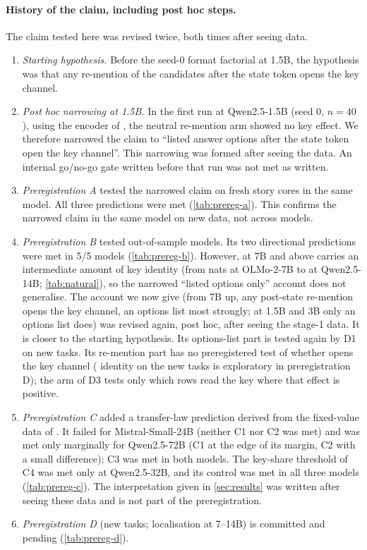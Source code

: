 \paragraph{History of the claim, including post hoc steps.} The claim tested here was revised twice, both times after seeing data.
\begin{enumerate}\setlength\itemsep{1pt}
  \item \emph{Starting hypothesis.} Before the seed-0 format factorial at 1.5B, the hypothesis was that any re-mention of the candidates after the state token opens the key channel.
  \item \emph{Post hoc narrowing at 1.5B.} In the first run at Qwen2.5-1.5B (seed 0, $n = 40$), using the encoder of \citet{anonymous2026fitted}, the neutral re-mention arm \fmtPost{} showed no key effect. We therefore narrowed the claim to ``listed answer options after the state token open the key channel''. This narrowing was formed after seeing the data. An internal go/no-go gate written before that run was not met as written.
  \item \emph{Preregistration A} tested the narrowed claim on fresh story cores in the same model. All three predictions were met (\cref{tab:prereg-a}). This confirms the narrowed claim in the same model on new data, not across models.
  \item \emph{Preregistration B} tested out-of-sample models. Its two directional predictions were met in 5/5 models (\cref{tab:prereg-b}). However, at 7B and above \fmtPost{} carries an intermediate amount of key identity (from \idKPostOlmoSeven{} nats at OLMo-2-7B to \idKPostQwenFourteen{} at Qwen2.5-14B; \cref{tab:natural}), so the narrowed ``listed options only'' account does not generalise. The account we now give (from 7B up, any post-state re-mention opens the key channel, an options list most strongly; at 1.5B and 3B only an options list does) was revised again, post hoc, after seeing the stage-1 data. It is closer to the starting hypothesis. Its options-list part is tested again by D1 on new tasks. Its re-mention part has no preregistered test of whether \fmtPost{} opens the key channel (\fmtPost{} identity on the new tasks is exploratory in preregistration D); the \fmtPost{} arm of D3 tests only which rows read the key where that effect is positive.
  \item \emph{Preregistration C} added a transfer-law prediction derived from the fixed-value data of \citet{anonymous2026fitted}. It failed for Mistral-Small-24B (neither C1 nor C2 was met) and was met only marginally for Qwen2.5-72B (C1 at the edge of its margin, C2 with a small difference); C3 was met in both models. The key-share threshold of C4 was met only at Qwen2.5-32B, and its \fmtBefore{} control was met in all three models (\cref{tab:prereg-c}). The interpretation given in \cref{sec:results} was written after seeing these data and is not part of the preregistration.
  \item \emph{Preregistration D} (new tasks; localisation at 7--14B) is committed and pending (\cref{tab:prereg-d}).
\end{enumerate}
